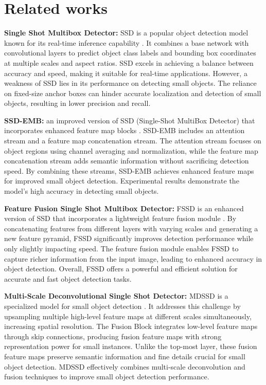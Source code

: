 \documentclass[a4paper]{article}
\begin{document}
	\section{Related works}
	
	\textbf{Single Shot Multibox Detector:} SSD is a popular object detection model known for its real-time inference capability \cite{ssd}. It combines a base network with convolutional layers to predict object class labels and bounding box coordinates at multiple scales and aspect ratios. SSD excels in achieving a balance between accuracy and speed, making it suitable for real-time applications. However, a weakness of SSD lies in its performance on detecting small objects. The reliance on fixed-size anchor boxes can hinder accurate localization and detection of small objects, resulting in lower precision and recall.
	
	\textbf{SSD-EMB:} an improved version of SSD (Single-Shot MultiBox Detector) that incorporates enhanced feature map blocks \cite{ssdemb}. SSD-EMB includes an attention stream and a feature map concatenation stream. The attention stream focuses on object regions using channel averaging and normalization, while the feature map concatenation stream adds semantic information without sacrificing detection speed. By combining these streams, SSD-EMB achieves enhanced feature maps for improved small object detection. Experimental results demonstrate the model's high accuracy in detecting small objects.
	
	\textbf{Feature Fusion Single Shot Multibox Detector:} FSSD is an enhanced version of SSD that incorporates a lightweight feature fusion module \cite{fssd}. By concatenating features from different layers with varying scales and generating a new feature pyramid, FSSD significantly improves detection performance while only slightly impacting speed. The feature fusion module enables FSSD to capture richer information from the input image, leading to enhanced accuracy in object detection. Overall, FSSD offers a powerful and efficient solution for accurate and fast object detection tasks.
	
	\textbf{Multi-Scale Deconvolutional Single Shot Detector:} MDSSD is a specialized model for small object detection \cite{mdssd}. It addresses this challenge by upsampling multiple high-level feature maps at different scales simultaneously, increasing spatial resolution. The Fusion Block integrates low-level feature maps through skip connections, producing fusion feature maps with strong representation power for small instances. Unlike the top-most layer, these fusion feature maps preserve semantic information and fine details crucial for small object detection. MDSSD effectively combines multi-scale deconvolution and fusion techniques to improve small object detection performance.
	
\end{document}
